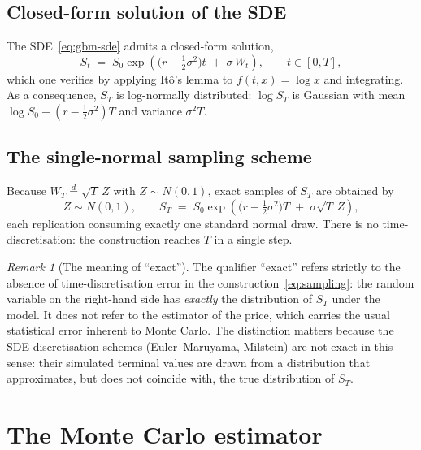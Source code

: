 \documentclass[11pt,a4paper]{article}
\theoremstyle{plain}
\theoremstyle{definition}
\theoremstyle{remark}
\newtheorem{remark}[theorem]{Remark}
\begin{document}
\subsection{Closed-form solution of the SDE}

The SDE~\eqref{eq:gbm-sde} admits a closed-form solution,
\begin{equation}
\label{eq:gbm-solution}
S_t \;=\; S_0 \exp\!\left(
\big(r - \tfrac{1}{2}\sigma^2\big) t \;+\; \sigma\, W_t
\right),
\qquad t \in [0,T],
\end{equation}
which one verifies by applying It\^{o}'s lemma to
$f(t, x) = \log x$ and integrating. As a consequence,
$S_T$ is log-normally distributed: $\log S_T$ is Gaussian with mean
$\log S_0 + (r - \tfrac{1}{2}\sigma^2)T$ and variance $\sigma^2 T$.

\subsection{The single-normal sampling scheme}

Because $W_T \overset{d}{=} \sqrt{T}\, Z$ with $Z \sim N(0,1)$, exact
samples of $S_T$ are obtained by
\begin{equation}
\label{eq:sampling}
Z \sim N(0,1),
\qquad
S_T \;=\; S_0 \exp\!\left(
\big(r - \tfrac{1}{2}\sigma^2\big) T \;+\; \sigma\sqrt{T}\, Z
\right),
\end{equation}
each replication consuming exactly one standard normal draw. There is
no time-discretisation: the construction reaches $T$ in a single step.

\begin{remark}[The meaning of ``exact'']
\label{rem:exact-meaning}
The qualifier ``exact'' refers strictly to the absence of
time-discretisation error in the construction~\eqref{eq:sampling}: the
random variable on the right-hand side has \emph{exactly} the
distribution of $S_T$ under the model. It does not refer to the
estimator of the price, which carries the usual statistical error
inherent to Monte Carlo. The distinction matters because the
SDE discretisation schemes (Euler--Maruyama, Milstein) are not exact in this
sense: their simulated terminal values are drawn from a
distribution that approximates, but does not coincide with, the true
distribution of $S_T$.
\end{remark}

\section{The Monte Carlo estimator}
\label{sec:estimator}
\end{document}
